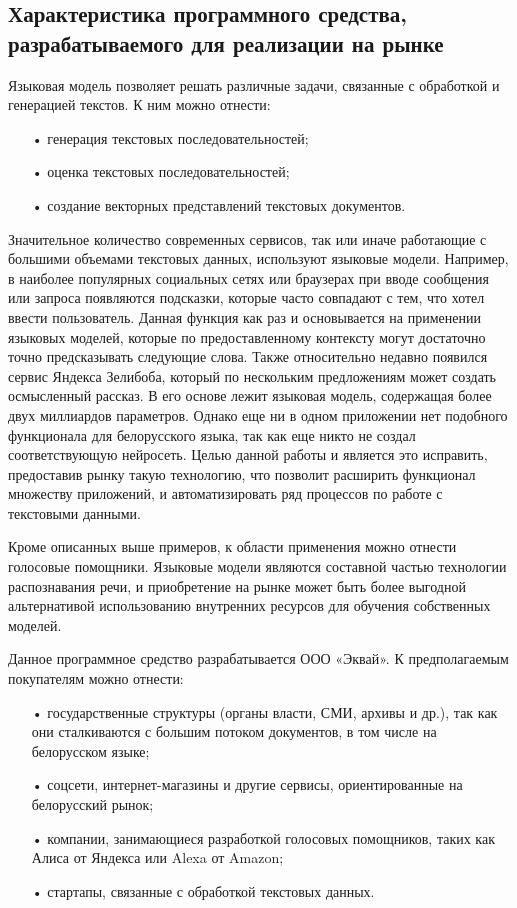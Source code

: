 
\subsection{Характеристика программного средства, разрабатываемого для реализации на рынке}
Языковая модель позволяет решать различные задачи, связанные с обработкой и генерацией текстов. К ним можно отнести:
\begin{itemize}
	\item[•] генерация текстовых последовательностей;
	\item[•] оценка текстовых последовательностей;
	\item[•] создание векторных представлений текстовых документов.
\end{itemize}

Значительное количество современных сервисов, так или иначе работающие с большими объемами текстовых данных, используют языковые модели. Например, в наиболее популярных социальных сетях или браузерах при вводе сообщения или запроса появляются подсказки, которые часто совпадают с тем, что хотел ввести пользователь. Данная функция как раз и основывается на применении языковых моделей, которые по предоставленному контексту могут достаточно точно предсказывать следующие слова.
Также относительно недавно появился сервис Яндекса Зелибоба, который по нескольким предложениям может создать осмысленный рассказ. В его основе лежит языковая модель, содержащая более двух миллиардов параметров. Однако еще ни в одном приложении нет подобного функционала для белорусского языка, так как еще никто не создал соответствующую нейросеть. Целью данной работы и является это исправить, предоставив рынку такую технологию, что позволит расширить функционал множеству приложений, и автоматизировать ряд процессов по работе с текстовыми данными.

Кроме описанных выше примеров, к области применения можно отнести голосовые помощники. Языковые модели являются составной частью технологии распознавания речи, и приобретение на рынке может быть более выгодной альтернативой использованию внутренних ресурсов для обучения собственных моделей.

Данное программное средство разрабатывается ООО «Эквай». К предполагаемым покупателям можно отнести:
\begin{itemize}
	\item[•] государственные структуры (органы власти, СМИ, архивы и др.), так как они сталкиваются с большим потоком документов, в том числе на белорусском языке;
	\item[•] соцсети, интернет-магазины и другие сервисы, ориентированные на белорусский рынок;
	\item[•] компании, занимающиеся разработкой голосовых помощников, таких как Алиса от Яндекса или Alexa от Amazon;
	\item[•] стартапы, связанные с обработкой текстовых данных.
\end{itemize}

